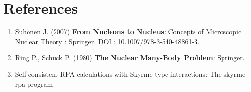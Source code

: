 \documentclass[a4paper]{paper}
\begin{document}
        \section*{References}
        \begin{enumerate}
            \item Suhonen J. (2007) \textbf{From Nucleons to Nucleus}: Concepts of Microscopic Nuclear Theory : Springer. DOI : 10.1007/978-3-540-48861-3.\label{ref:nucleonstonucleus}
            \item Ring P., Schuck P. (1980) \textbf{The Nuclear Many-Body Problem}: Springer.\label{ref:nuclearmany}
            \item Self-consistent RPA calculations with Skyrme-type interactions: The skyrme-rpa program \label{ref:rpacode}
            
        \end{enumerate}
    
\end{document}
